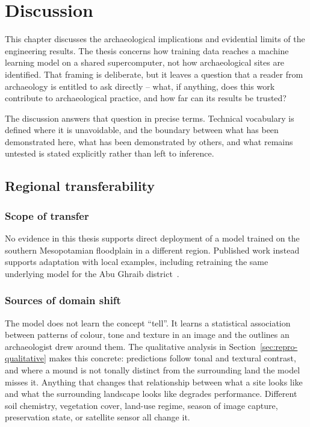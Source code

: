 \section{Discussion}
\label{ch:archaeology}

This chapter discusses the archaeological implications and evidential limits of
the engineering results. The thesis concerns how training data
reaches a machine learning model on a shared supercomputer, not how
archaeological sites are identified. That framing is deliberate, but it leaves
a question that a reader from archaeology is entitled to ask directly -- what,
if anything, does this work contribute to archaeological practice, and how far
can its results be trusted?

The discussion answers that question in precise terms. Technical vocabulary is defined where
it is unavoidable, and the boundary between what has been demonstrated here,
what has been demonstrated by others, and what remains untested is stated
explicitly rather than left to inference.

\subsection{Regional transferability}
\label{sec:arch-regions}

\subsubsection{Scope of transfer}
No evidence in this thesis supports direct deployment of a model trained on the
southern Mesopotamian floodplain in a different region. Published work instead
supports adaptation with local examples, including retraining the same underlying
model for the Abu Ghraib district~\cite{Pistola25}.

\subsubsection{Sources of domain shift}
The model does not learn the concept ``tell''. It learns a statistical
association between patterns of colour, tone and texture in an image and the
outlines an archaeologist drew around them. The qualitative analysis in
Section~\ref{sec:repro-qualitative} makes this concrete: predictions follow
tonal and textural contrast, and where a mound is not tonally distinct from the
surrounding land the model misses it. Anything that changes that relationship
between what a site looks like and what the surrounding landscape looks like
degrades performance. Different soil chemistry, vegetation cover, land-use
regime, season of image capture, preservation state, or satellite sensor all
change it.

